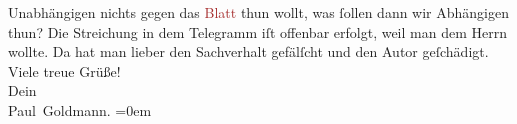                Unabhängigen nichts gegen das \textcolor{brown}{Blatt}{}\ledrightnote{{$\rightarrow$}\textcolor{brown}{Neue Freie Presse}} thun wollt, was ſollen dann wir Abhängigen thun?\pend
           \pstart
           Die Streichung in dem Telegramm iſt offenbar erfolgt, weil man dem Herrn \label{K_L02945-12v}\label{K_L02945-12h} wollte. Da hat man lieber {\pb}den Sachverhalt
               gefälſcht und den Autor geſchädigt.\pend
           \pstart
           Viele treue Grüße! {\\[\baselineskip]}Dein {\\[\baselineskip]}\spacefill\mbox{Paul Goldmann.}\pend
           \leftskip=0em{}\endnumbering{}  
      
